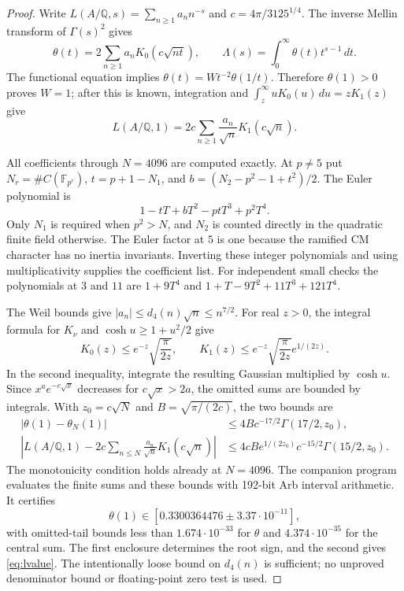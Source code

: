 \documentclass[11pt]{article}
\newcommand{\Q}{\mathbb Q}
\newcommand{\F}{\mathbb F}
\theoremstyle{definition}
\begin{document}
\begin{proof}
Write $L(A/\Q,s)=\sum_{n\geq1}a_nn^{-s}$ and
$c=4\pi/3125^{1/4}$. The inverse Mellin transform of $\Gamma(s)^2$
gives
\[
\theta(t)=2\sum_{n\geq1}a_nK_0(c\sqrt{nt}),\qquad
\Lambda(s)=\int_0^\infty\theta(t)t^{s-1}\,dt.
\]
The functional equation implies $\theta(t)=Wt^{-2}\theta(1/t)$.
Therefore $\theta(1)>0$ proves $W=1$; after this is known, integration
and $\int_z^\infty uK_0(u)\,du=zK_1(z)$ give
\[
L(A/\Q,1)=2c\sum_{n\geq1}\frac{a_n}{\sqrt n}K_1(c\sqrt n).
\tag{4.3}\label{eq:central}
\]

All coefficients through $N=4096$ are computed exactly. At $p\ne5$
put $N_r=\#C(\F_{p^r})$, $t=p+1-N_1$, and
$b=(N_2-p^2-1+t^2)/2$. The Euler polynomial is
\[
1-tT+bT^2-ptT^3+p^2T^4.
\tag{4.4}
\]
Only $N_1$ is required when $p^2>N$, and $N_2$ is counted directly in
the quadratic finite field otherwise. The Euler factor at $5$ is one
because the ramified CM character has no inertia invariants. Inverting
these integer polynomials and using multiplicativity supplies the
coefficient list. For independent small checks the polynomials at
$3$ and $11$ are $1+9T^4$ and $1+T-9T^2+11T^3+121T^4$.

The Weil bounds give $|a_n|\leq d_4(n)\sqrt n\leq n^{7/2}$.
For real $z>0$, the integral formula for $K_\nu$ and
$\cosh u\geq1+u^2/2$ give
\[
K_0(z)\leq e^{-z}\sqrt{\frac\pi{2z}},\qquad
K_1(z)\leq e^{-z}\sqrt{\frac\pi{2z}}e^{1/(2z)}.
\tag{4.5}\label{eq:kbound}
\]
In the second inequality, integrate the resulting Gaussian multiplied
by $\cosh u$. Since $x^a e^{-c\sqrt x}$ decreases for
$c\sqrt x>2a$, the omitted sums are bounded by integrals. With
$z_0=c\sqrt N$ and $B=\sqrt{\pi/(2c)}$, the two bounds are
\begin{align*}
|\theta(1)-\theta_N(1)|
&\leq4B c^{-17/2}\Gamma(17/2,z_0),\\
\left|L(A/\Q,1)-2c\sum_{n\leq N}\frac{a_n}{\sqrt n}K_1(c\sqrt n)\right|
&\leq4cB e^{1/(2z_0)}c^{-15/2}\Gamma(15/2,z_0).
\end{align*}
The monotonicity condition holds already at $N=4096$.
The companion program evaluates the finite sums and these bounds with
192-bit Arb interval arithmetic. It certifies
\[
\theta(1)\in[0.3300364476\mathbin\pm3.37\cdot10^{-11}],
\]
with omitted-tail bounds less than $1.674\cdot10^{-33}$ for $\theta$
and $4.374\cdot10^{-35}$ for the central sum. The first enclosure
determines the root sign, and the second gives \eqref{eq:lvalue}.
The intentionally loose bound on $d_4(n)$ is sufficient; no unproved
denominator bound or floating-point zero test is used.
\end{proof}
\end{document}
